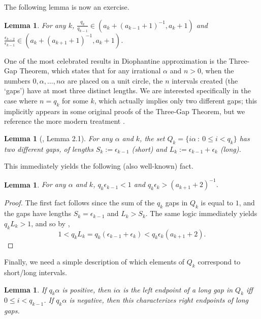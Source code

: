 \documentclass[11pt,reqno]{amsart}
\newtheorem{lemma}[theorem]{Lemma}
\theoremstyle{definition}
\theoremstyle{plain}
\begin{document}
The following lemma is now an exercise.

\begin{lemma}\label{ratios}
For any $k$, $\frac{q_{k}}{q_{k-1}} \in (a_k + (a_{k-1}+1)^{-1}, a_k + 1)$ and $\frac{\epsilon_{k-2}}{\epsilon_{k-1}} \in 
(a_{k} + (a_{k+1} + 1)^{-1}, a_{k} + 1)$.
\end{lemma}

One of the most celebrated results in Diophantine approximation is the Three-Gap Theorem, which states that for any irrational $\alpha$ and $n > 0$, when the numbers $0, \alpha, \ldots, n\alpha$ are placed on a unit circle, the $n$ intervals created (the `gaps') have at most three distinct lengths. We are interested specifically in the case where $n = q_k$ for some $k$, which actually implies only two different gaps; this implicitly appears in some original proofs of the Three-Gap Theorem, but we reference the more modern treatment \cite{3gap}. 


\begin{lemma}[\cite{3gap}, Lemma 2.1]\label{longshort}
For any $\alpha$ and $k$, the set $Q_k = \{i\alpha \ : \ 0 \leq i < q_k\}$ has two different gaps, of lengths $S_k := \epsilon_{k-1}$ (short) and $L_k := \epsilon_{k-1} + \epsilon_k$ (long).
\end{lemma}

This immediately yields the following (also well-known) fact.

\begin{lemma}\label{qeps}
For any $\alpha$ and $k$, $q_k \epsilon_{k-1} < 1$ and $q_k \epsilon_k > (a_{k+1} + 2)^{-1}$. %
\end{lemma}

\begin{proof}
The first fact follows since the sum of the $q_k$ gaps in $Q_k$ is equal to $1$, and the gaps have lengths $S_k = \epsilon_{k-1}$ and $L_k > S_k$. The same logic immediately yields $q_k L_k > 1$, and so by ,
\[
1 < q_k L_k = q_k (\epsilon_{k-1} + \epsilon_k) < q_k \epsilon_k (a_{k+1} + 2).
\]
\end{proof}

Finally, we need a simple description of which elements of $Q_k$ correspond to short/long intervals.

\begin{lemma}\label{endpts}
If $q_k \alpha$ is positive, then $i\alpha$ is the left endpoint of a long gap in $Q_k$ iff $0 \leq i < q_{k-1}$. If $q_k \alpha$ is negative, then this characterizes right endpoints of long gaps. 
\end{lemma}
\end{document}

